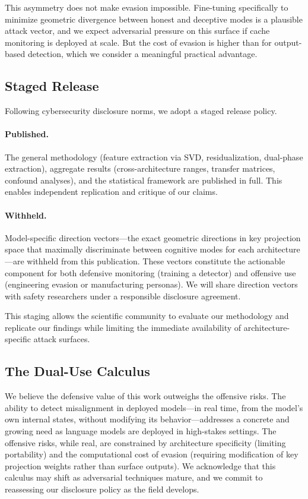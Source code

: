 This asymmetry does not make evasion impossible.
Fine-tuning specifically to minimize geometric divergence between honest and deceptive modes is a plausible attack vector, and we expect adversarial pressure on this surface if cache monitoring is deployed at scale.
But the cost of evasion is higher than for output-based detection, which we consider a meaningful practical advantage.

\subsection{Staged Release}

Following cybersecurity disclosure norms, we adopt a staged release policy.

\paragraph{Published.}
The general methodology (feature extraction via SVD, \fwl residualization, dual-phase extraction), aggregate results (cross-architecture \auroc ranges, transfer matrices, confound analyses), and the statistical framework are published in full.
This enables independent replication and critique of our claims.

\paragraph{Withheld.}
Model-specific direction vectors---the exact geometric directions in key projection space that maximally discriminate between cognitive modes for each architecture---are withheld from this publication.
These vectors constitute the actionable component for both defensive monitoring (training a detector) and offensive use (engineering evasion or manufacturing personas).
We will share direction vectors with safety researchers under a responsible disclosure agreement.

This staging allows the scientific community to evaluate our methodology and replicate our findings while limiting the immediate availability of architecture-specific attack surfaces.

\subsection{The Dual-Use Calculus}

We believe the defensive value of this work outweighs the offensive risks.
The ability to detect misalignment in deployed models---in real time, from the model's own internal states, without modifying its behavior---addresses a concrete and growing need as language models are deployed in high-stakes settings.
The offensive risks, while real, are constrained by architecture specificity (limiting portability) and the computational cost of evasion (requiring modification of key projection weights rather than surface outputs).
We acknowledge that this calculus may shift as adversarial techniques mature, and we commit to reassessing our disclosure policy as the field develops.